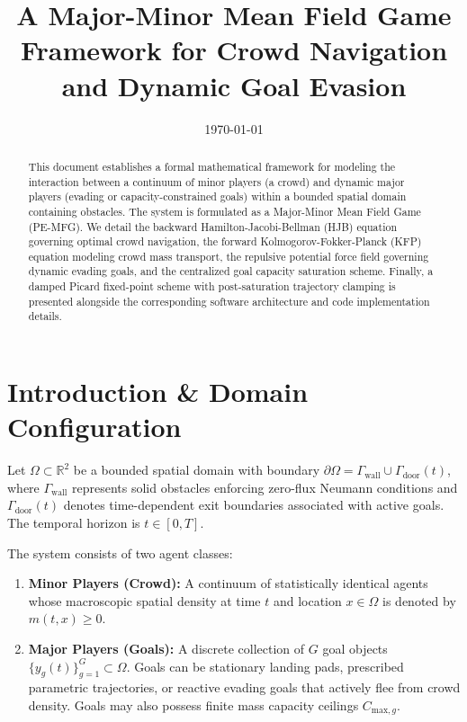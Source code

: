 \documentclass[11pt,a4paper]{article}
\title{\textbf{A Major-Minor Mean Field Game Framework for Crowd Navigation and Dynamic Goal Evasion}}
\date{\today}
\begin{document}
\maketitle

\begin{abstract}
This document establishes a formal mathematical framework for modeling the interaction between a continuum of minor players (a crowd) and dynamic major players (evading or capacity-constrained goals) within a bounded spatial domain containing obstacles. The system is formulated as a Major-Minor Mean Field Game (PE-MFG). We detail the backward Hamilton-Jacobi-Bellman (HJB) equation governing optimal crowd navigation, the forward Kolmogorov-Fokker-Planck (KFP) equation modeling crowd mass transport, the repulsive potential force field governing dynamic evading goals, and the centralized goal capacity saturation scheme. Finally, a damped Picard fixed-point scheme with post-saturation trajectory clamping is presented alongside the corresponding software architecture and code implementation details.
\end{abstract}

\section{Introduction \& Domain Configuration}
Let $\Omega \subset \mathbb{R}^2$ be a bounded spatial domain with boundary $\partial\Omega = \Gamma_{\text{wall}} \cup \Gamma_{\text{door}}(t)$, where $\Gamma_{\text{wall}}$ represents solid obstacles enforcing zero-flux Neumann conditions and $\Gamma_{\text{door}}(t)$ denotes time-dependent exit boundaries associated with active goals. The temporal horizon is $t \in [0, T]$.

The system consists of two agent classes:
\begin{enumerate}
    \item \textbf{Minor Players (Crowd):} A continuum of statistically identical agents whose macroscopic spatial density at time $t$ and location $x \in \Omega$ is denoted by $m(t, x) \ge 0$.
    \item \textbf{Major Players (Goals):} A discrete collection of $G$ goal objects $\{y_g(t)\}_{g=1}^G \subset \Omega$. Goals can be stationary landing pads, prescribed parametric trajectories, or reactive evading goals that actively flee from crowd density. Goals may also possess finite mass capacity ceilings $C_{\text{max}, g}$.
\end{enumerate}
\end{document}
